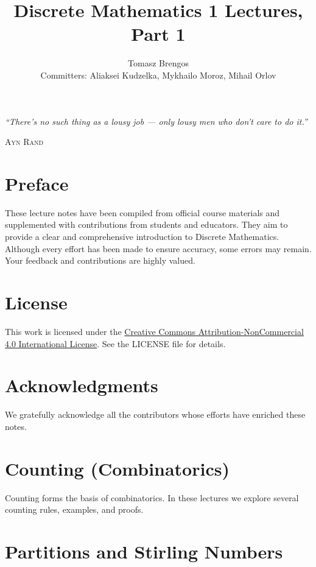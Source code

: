 \documentclass{article}
\title{Discrete Mathematics 1 Lectures, Part 1}
\author{Tomasz Brengos \\  
Committers: Aliaksei Kudzelka, Mykhailo Moroz, Mihail Orlov}
\date{}
\newcommand{\includelectureSub}[1]{%
  \begingroup
    \renewcommand{\section}{\subsection}%
  \endgroup
}
\begin{document}
\maketitle

\epigraph{\textit{``There's no such thing as a lousy job --- only lousy men who don't care to do it.''}}{\textsc{Ayn Rand}}

\vspace{6cm}

\section*{Preface}
These lecture notes have been compiled from official course materials and supplemented with contributions from students and educators. They aim to provide a clear and comprehensive introduction to Discrete Mathematics. Although every effort has been made to ensure accuracy, some errors may remain. Your feedback and contributions are highly valued.

\section*{License}
This work is licensed under the \href{https://creativecommons.org/licenses/by-nc/4.0/}{Creative Commons Attribution-NonCommercial 4.0 International License}. See the LICENSE file for details.


\section*{Acknowledgments}
We gratefully acknowledge all the contributors whose efforts have enriched these notes.

\cleardoublepage

\tableofcontents
\clearpage

\section{Counting (Combinatorics)}
Counting forms the basis of combinatorics. In these lectures we explore several counting rules, examples, and proofs.
\includelectureSub{Counting}

\section{Partitions and Stirling Numbers}
\includelectureSub{Partitions_StirlingNumbers}
\end{document}
